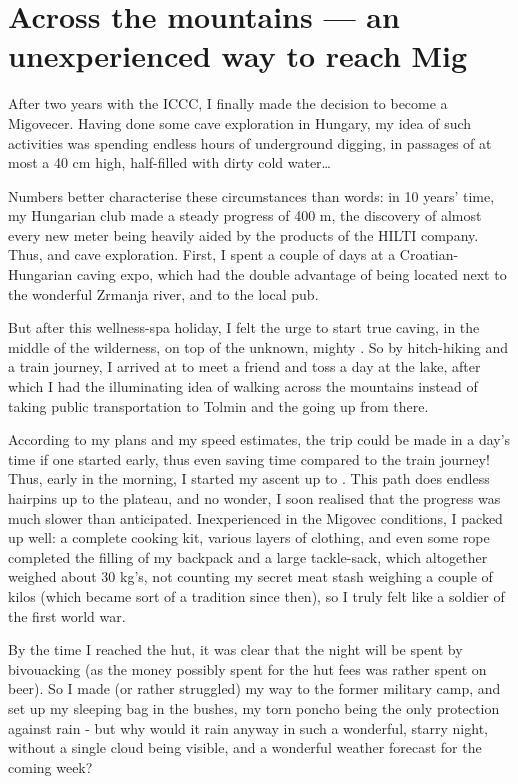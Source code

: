 \section{Across the mountains --- an unexperienced way to reach
Mig}

After two years with the ICCC, I finally made the decision to become a
Migovecer. Having done some cave exploration in Hungary, my idea of such
activities was spending endless hours of underground digging, in
passages of at most a 40 cm high, half-filled with dirty cold
water\ldots{}

Numbers better characterise these circumstances than words: in 10 years'
time, my Hungarian club made a steady progress of 400 m, the discovery
of almost every new meter being heavily aided by the products of the
HILTI company. Thus,  and cave exploration. First, I spent a couple of days at a
Croatian-Hungarian caving expo, which had the double advantage of being
located next to the wonderful Zrmanja river, and to the local pub.

But after this wellness-spa holiday, I felt the urge to start true
caving, in the middle of the wilderness, on top of the unknown, mighty
. So by hitch-hiking and a train journey, I arrived at  to meet a friend and toss a day at the lake, after which I had
the illuminating idea of walking across the mountains instead of taking
public transportation to Tolmin and the going up from there.

According to my plans and my speed estimates, the trip could be made in
a day's time if one started early, thus even saving time compared to the
train journey! Thus, early in the morning, I started my ascent up to . This path does endless hairpins up to the plateau, and no
wonder, I soon realised that the progress was much slower than
anticipated. Inexperienced in the Migovec conditions, I packed up well:
a complete cooking kit, various layers of clothing, and even some rope
completed the filling of my backpack and a large tackle-sack, which
altogether weighed about 30 kg's, not counting my secret meat stash
weighing a couple of kilos (which became sort of a tradition since
then), so I truly felt like a soldier of the first world war.

By the time I reached the hut, it was clear that the night will be spent
by bivouacking (as the money possibly spent for the hut fees was rather
spent on beer). So I made (or rather struggled) my way to the former
military camp, and set up my sleeping bag in the bushes, my torn poncho
being the only protection against rain - but why would it rain anyway in
such a wonderful, starry night, without a single cloud being visible,
and a wonderful weather forecast for the coming week?


